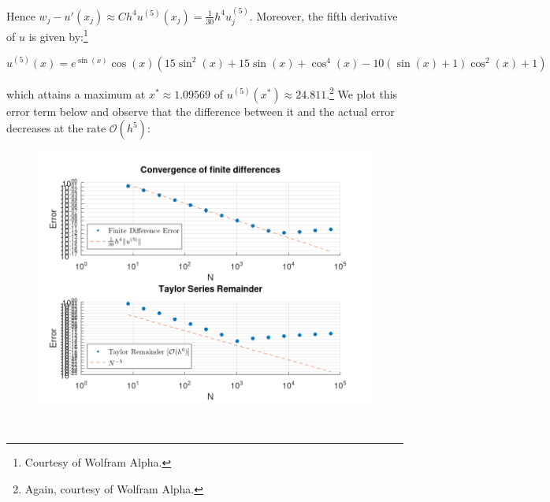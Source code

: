 \begin{solution}
  Hence $w_j - u'(x_j) \approx Ch^4 u^{(5)}(x_j) = \frac{1}{30} h^4 u_j^{(5)}$. Moreover, the fifth derivative of $u$ is
  given by:\footnote{
    Courtesy of Wolfram Alpha.
  }

  $$
  u^{(5)}(x) = e^{\sin{(x)}} \cos{(x)} \left( 15 \sin^2{(x)} + 15 \sin{(x)} + \cos^4{(x)} - 10 (\sin{(x)} + 1) \cos^2{(x)} + 1 \right)
  $$

  which attains a maximum at $x^* \approx 1.09569$ of $u^{(5)}(x^*) \approx 24.811$.\footnote{
    Again, courtesy of Wolfram Alpha.
  } We plot this error term below and observe that the difference between it and the actual error decreases at
  the rate $\mathcal{O}(h^5)$:

  \begin{figure}[h]
    \centering
    \includegraphics*[width=\textwidth]{problem_3.png}
  \end{figure}

  \ \\
\end{solution}
